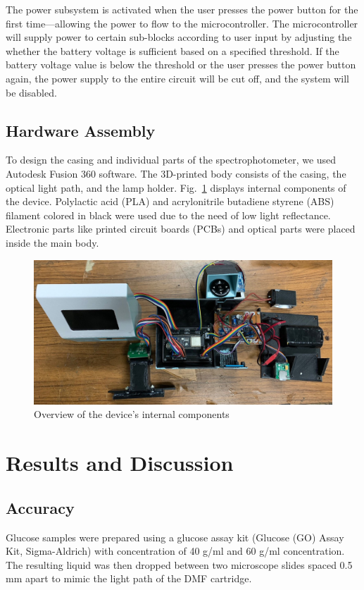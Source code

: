 \documentclass[conference]{IEEEtran}
\begin{document}
The power subsystem is activated when the user presses the power button for the first time—allowing the power to flow to the microcontroller. The microcontroller will supply power to certain sub-blocks according to user input by adjusting the whether the battery voltage is sufficient based on a specified threshold. If the battery voltage value is below the threshold or the user presses the power button again, the power supply to the entire circuit will be cut off, and the system will be disabled.

\subsection{Hardware Assembly}
To design the casing and individual parts of the spectrophotometer, we used Autodesk Fusion 360 software.
The 3D-printed body consists of the casing, the optical light path, and the lamp holder.
Fig.~\ref{hardware} displays internal components of the device.
Polylactic acid (PLA) and acrylonitrile butadiene styrene (ABS) filament colored in black were used due to the need of low light reflectance.
Electronic parts like printed circuit boards (PCBs) and optical parts were placed inside the main body.

    \begin{figure}[htbp]
    \centerline{\includegraphics[scale=0.15]{hardware-2.jpg}}
    \caption{Overview of the device's internal components}
    \label{hardware}
    \end{figure}

\section{Results and Discussion}
\subsection{Accuracy}
Glucose samples were prepared using a glucose assay kit (Glucose (GO) Assay Kit, Sigma-Aldrich\cite{b6}) with concentration of 40 {\textmu}g/ml and 60 {\textmu}g/ml concentration.
The resulting liquid was then dropped between two microscope slides spaced 0.5 mm apart to mimic the light path of the DMF cartridge.
\end{document}
